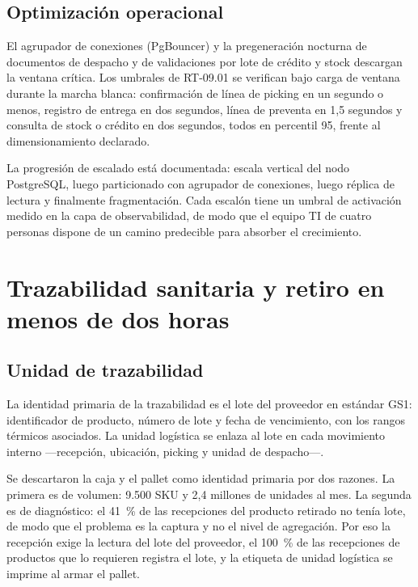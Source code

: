 \subsection{Optimización operacional}
\label{sec:optimizacion}

El agrupador de conexiones (PgBouncer) y la pregeneración nocturna de
documentos de despacho y de validaciones por lote de crédito y stock descargan
la ventana crítica.  Los umbrales de RT-09.01 se verifican bajo carga de
ventana durante la marcha blanca: confirmación de línea de picking en un
segundo o menos, registro de entrega en dos segundos, línea de preventa en
1,5 segundos y consulta de stock o crédito en dos segundos, todos en percentil
95, frente al dimensionamiento declarado.

La progresión de escalado está documentada: escala vertical del nodo PostgreSQL,
luego particionado con agrupador de conexiones, luego réplica de lectura y
finalmente fragmentación.  Cada escalón tiene un umbral de activación medido
en la capa de observabilidad, de modo que el equipo TI de cuatro personas
dispone de un camino predecible para absorber el crecimiento.



\section{Trazabilidad sanitaria y retiro en menos de dos horas}
\label{sec:trazabilidad}

\subsection{Unidad de trazabilidad}

La identidad primaria de la trazabilidad es el lote del proveedor en estándar
GS1: identificador de producto, número de lote y fecha de vencimiento, con los
rangos térmicos asociados.  La unidad logística se enlaza al lote en cada
movimiento interno ---recepción, ubicación, picking y unidad de despacho---.

Se descartaron la caja y el pallet como identidad primaria por dos razones.  La
primera es de volumen: 9.500 SKU y 2,4 millones de unidades al mes.  La segunda
es de diagnóstico: el 41~\% de las recepciones del producto retirado no tenía
lote, de modo que el problema es la captura y no el nivel de agregación.  Por
eso la recepción exige la lectura del lote del proveedor, el 100~\% de las
recepciones de productos que lo requieren registra el lote, y la etiqueta de
unidad logística se imprime al armar el pallet.

